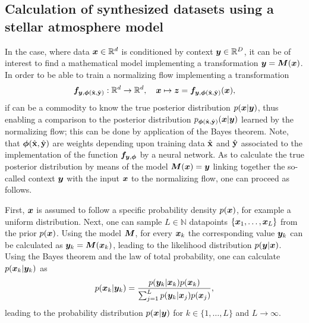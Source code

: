 \documentclass[a4paper,12pt]{report}
\begin{document}
\subsection{Calculation of synthesized datasets using a stellar atmosphere model}
In the case, where data $\bm{x} \in \mathbb{R}^d$ is conditioned by context $\bm{y} \in \mathbb{R}^D$, it can be of interest to find a mathematical model implementing a transformation $\bm{y} = \bm{M}(\bm{x})$. In order to be able to train a normalizing flow implementing a transformation \begin{gather}
\bm{f}_{\bm{y},\bm{\phi}(\hat{\boldsymbol{\mathbf{x}}},\hat{\boldsymbol{\mathbf{y}}})}: \mathbb{R}^d\rightarrow \mathbb{R}^d, \quad \bm{x}\mapsto \bm{z} =  \bm{f}_{\bm{y},\bm{\phi}(\hat{\boldsymbol{\mathbf{x}}},\hat{\boldsymbol{\mathbf{y}}})}(\bm{x}),
\end{gather} if can be a commodity to know the true posterior distribution $p(\bm{x}|\bm{y})$, thus enabling a comparison to the posterior distribution $p_{\bm{\phi}(\hat{\boldsymbol{\mathbf{x}}},\hat{\boldsymbol{\mathbf{y}}})}(\bm{x}|\bm{y})$ learned by the normalizing flow; this can be done by application of the Bayes theorem. Note, that $\bm{\phi}(\hat{\boldsymbol{\mathbf{x}}},\hat{\boldsymbol{\mathbf{y}}})$ are weights depending upon training data $\hat{\boldsymbol{\mathbf{x}}}$ and $\hat{\boldsymbol{\mathbf{y}}}$ associated to the implementation of the function $\bm{f}_{\bm{y},\bm{\phi}}$ by a neural network. As to calculate the true posterior distribution by means of the model $\bm{M}(\bm{x}) = \bm{y}$ linking together the so-called context $\bm{y}$ with the input $\bm{x}$ to the normalizing flow, one can proceed as follows.

First, $\bm{x}$ is assumed to follow a specific probability density $p(\bm{x})$, for example a uniform distribution. Next, one can sample $L\in \mathbb{N}$ datapoints $\{\bm{x}_{1},\dots,\bm{x}_{L}\}$ from the prior $p(\bm{x})$. Using the model $\bm{M}$, for every $\bm{x}_{k}$ the corresponding value $\bm{y}_{k}$ can be calculated as $\bm{y}_{k} = \bm{M}(\bm{x}_{k})$, leading to the likelihood distribution $p(\bm{y}|\bm{x})$. Using the Bayes theorem and the law of total probability, one can calculate $p(\bm{x}_{k}|\bm{y}_{k})$ as \begin{equation}
p(\bm{x}_{k}|\bm{y}_{k}) = \frac{p(\bm{y}_{k}|\bm{x}_{k})p(\bm{x}_{k})}{\sum_{j=1}^{L}p(\bm{y}_{k}|\bm{x}_{j})p(\bm{x}_{j})},
\end{equation} leading to the probability distribution $p(\bm{x}|\bm{y})$ for $k \in \{1,\dots,L\}$ and $L \rightarrow \infty$.
\end{document}
